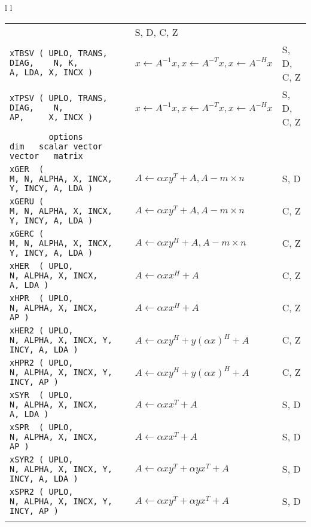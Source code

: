 \begin{tabular}{ l l }
\begin{tabular}{ l l l }
   & S, D, C, Z \\
\verb+xTBSV ( UPLO, TRANS, DIAG,    N, K,             A, LDA, X, INCX )+ &
$ x \leftarrow A ^{-1} x, x \leftarrow A ^{-T} x, x \leftarrow A ^ {-H} x $
   & S, D, C, Z \\
\verb+xTPSV ( UPLO, TRANS, DIAG,    N,                AP,     X, INCX )+ &
$ x \leftarrow A ^{-1} x, x \leftarrow A ^{-T} x, x \leftarrow A ^ {-H} x $
   & S, D, C, Z \\
\verb+        options            dim   scalar vector   vector   matrix+ &\\
\verb+xGER  (                    M, N, ALPHA, X, INCX, Y, INCY, A, LDA )+ &
$ A \leftarrow \alpha x y ^{T} + A , A - m \times n $
   & S, D \\
\verb+xGERU (                    M, N, ALPHA, X, INCX, Y, INCY, A, LDA )+ &
$ A \leftarrow \alpha x y ^{T} + A , A - m \times n $
   & C, Z \\
\verb+xGERC (                    M, N, ALPHA, X, INCX, Y, INCY, A, LDA )+ &
$ A \leftarrow \alpha x y ^{H} + A , A - m \times n $
   & C, Z \\
\verb+xHER  ( UPLO,                 N, ALPHA, X, INCX,          A, LDA )+ &
$ A \leftarrow \alpha x x ^{H} + A $
   & C, Z \\
\verb+xHPR  ( UPLO,                 N, ALPHA, X, INCX,          AP )+ &
$ A \leftarrow \alpha x x ^{H} + A $
   & C, Z \\
\verb+xHER2 ( UPLO,                 N, ALPHA, X, INCX, Y, INCY, A, LDA )+ &
$ A \leftarrow \alpha x y ^{H} + y ( \alpha x ) ^ {H} + A $
   & C, Z \\
\verb+xHPR2 ( UPLO,                 N, ALPHA, X, INCX, Y, INCY, AP )+ &
$ A \leftarrow \alpha x y ^{H} + y ( \alpha x ) ^ {H} + A $
   & C, Z \\
\verb+xSYR  ( UPLO,                 N, ALPHA, X, INCX,          A, LDA )+ &
$ A \leftarrow \alpha x x ^{T} + A $
   & S, D \\
\verb+xSPR  ( UPLO,                 N, ALPHA, X, INCX,          AP )+ &
$ A \leftarrow \alpha x x ^{T} + A $
   & S, D \\
\verb+xSYR2 ( UPLO,                 N, ALPHA, X, INCX, Y, INCY, A, LDA )+ &
$ A \leftarrow \alpha x y ^{T} + \alpha y x ^ {T} + A $
   & S, D \\
\verb+xSPR2 ( UPLO,                 N, ALPHA, X, INCX, Y, INCY, AP )+ &
$ A \leftarrow \alpha x y ^{T} + \alpha y x ^ {T} + A $
   & S, D \\ \\ 


\end{tabular}
\end{tabular}
